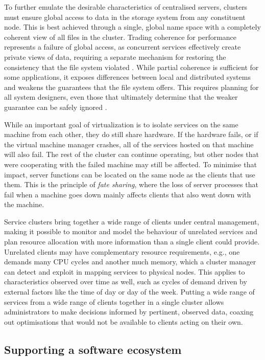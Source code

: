 To further emulate the desirable characteristics of centralised servers, clusters must ensure global access to data in the storage system from any constituent node. This is best achieved through a single, global name space with a completely coherent view of all files in the cluster. Trading coherence for performance represents a failure of global access, as concurrent services effectively create private views of data, requiring a separate mechanism for restoring the consistency that the file system violated \cite{birrell93}. While partial coherence is sufficient for some applications, it exposes differences between local and distributed systems and weakens the guarantees that the file system offers. This requires planning for all system designers, even those that ultimately determine that the weaker guarantee can be safely ignored \cite{waldo}.

While an important goal of virtualization is to isolate services on the same machine from each other, they do still share hardware. If the hardware fails, or if the virtual machine manager crashes, all of the services hosted on that machine will also fail. The rest of the cluster can continue operating, but other nodes that were cooperating with the failed machine may still be affected. To minimise that impact, server functions can be located on the same node as the clients that use them. This is the principle of \emph{fate sharing}, where the loss of server processes that fail when a machine goes down mainly affects clients that also went down with the machine.

Service clusters bring together a wide range of clients under central management, making it possible to monitor and model the behaviour of unrelated services and plan resource allocation with more information than a single client could provide. Unrelated clients may have complementary resource requirements, e.g., one demands many CPU cycles and another much memory, which a cluster manager can detect and exploit in mapping services to physical nodes. This applies to characteristics observed over time as well, such as cycles of demand driven by external factors like the time of day or day of the week. Putting a wide range of services from a wide range of clients together in a single cluster allows administrators to make decisions informed by pertinent, observed data, coaxing out optimisations that would not be available to clients acting on their own.

\subsection{Supporting a software ecosystem}

